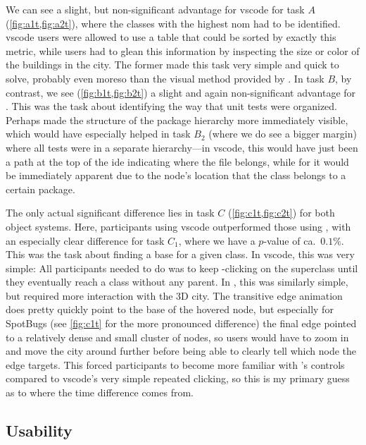 \documentclass[../thesis]{subfiles}
\begin{document}
We can see a slight, but non-significant advantage for \gls{vscode} for task $A$ (\cref{fig:a1t,fig:a2t}), where the classes with the highest \gls{nom} had to be identified.
\gls{vscode} users were allowed to use a table that could be sorted by exactly this metric, while \SEE{} users had to glean this information by inspecting the size or color of the buildings in the \gls{city}.
The former made this task very simple and quick to solve, probably even moreso than the visual method provided by \SEE{}.
In task $B$, by contrast, we see (\cref{fig:b1t,fig:b2t}) a slight and again non-significant advantage for \SEE{}.
This was the task about identifying the way that unit tests were organized.
Perhaps \SEE{} made the structure of the package hierarchy more immediately visible, which would have especially helped in task $B_2$ (where we do see a bigger margin) where all tests were in a separate hierarchy---in \gls{vscode}, this would have just been a path at the top of the \gls{ide} indicating where the file belongs, while for \SEE{} it would be immediately apparent due to the node's location that the class belongs to a certain package.

The only actual significant difference lies in task $C$ (\cref{fig:c1t,fig:c2t}) for both object systems.
Here, participants using \gls{vscode} outperformed those using \SEE{}, with an especially clear difference for task $C_1$, where we have a $p$-value of ca.\ $0.1\%$.
This was the task about finding a \gls{base} for a given class.
In \gls{vscode}, this was very simple:
All participants needed to do was to keep -clicking on the superclass until they eventually reach a class without any parent.
In \SEE{}, this was similarly simple, but required more interaction with the 3D city.
The transitive edge animation does pretty quickly point to the \gls{base} of the hovered node, but especially for SpotBugs (see \cref{fig:c1t} for the more pronounced difference) the final edge pointed to a relatively dense and small cluster of nodes, so users would have to zoom in and move the city around further before being able to clearly tell which node the edge targets.
This forced participants to become more familiar with \SEE{}'s controls compared to \gls{vscode}'s very simple repeated clicking, so this is my primary guess as to where the time difference comes from.

\subsection{Usability}
\fxfatal{}
\end{document}

